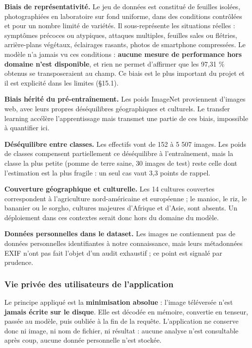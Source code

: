 \documentclass[10pt,a4paper]{article}
\begin{document}
\textbf{Biais de représentativité.} Le jeu de données est constitué de feuilles isolées, photographiées en laboratoire sur fond uniforme, dans des conditions contrôlées et pour un nombre limité de variétés. Il sous-représente les situations réelles : symptômes précoces ou atypiques, attaques multiples, feuilles sales ou flétries, arrière-plans végétaux, éclairages rasants, photos de smartphone compressées. Le modèle n'a jamais vu ces conditions : \textbf{aucune mesure de performance hors domaine n'est disponible}, et rien ne permet d'affirmer que les 97,31 \% obtenus se transposeraient au champ. Ce biais est le plus important du projet et il est explicité dans les limites (\S{}15.1).

\textbf{Biais hérité du pré-entraînement.} Les poids ImageNet proviennent d'images web, avec leurs propres déséquilibres géographiques et culturels. Le transfer learning accélère l'apprentissage mais transmet une partie de ces biais, impossible à quantifier ici.

\textbf{Déséquilibre entre classes.} Les effectifs vont de 152 à 5 507 images. Les poids de classes compensent partiellement ce déséquilibre à l'entraînement, mais la classe la plus petite (pomme de terre saine, 30 images de test) reste celle dont l'estimation est la plus fragile : un seul cas vaut 3,3 points de rappel.

\textbf{Couverture géographique et culturelle.} Les 14 cultures couvertes correspondent à l'agriculture nord-américaine et européenne ; le manioc, le riz, le bananier ou le sorgho, cultures majeures d'Afrique et d'Asie, sont absents. Un déploiement dans ces contextes serait donc hors du domaine du modèle.

\textbf{Données personnelles dans le dataset.} Les images ne contiennent pas de données personnelles identifiantes à notre connaissance, mais leurs métadonnées EXIF n'ont pas fait l'objet d'un audit exhaustif ; ce point est signalé par prudence.

\subsubsection{Vie privée des utilisateurs de l'application}

Le principe appliqué est la \textbf{minimisation absolue} : l'image téléversée n'est \textbf{jamais écrite sur le disque}. Elle est décodée en mémoire, convertie en tenseur, passée au modèle, puis oubliée à la fin de la requête. L'application ne conserve donc ni image, ni nom de fichier, ni résultat : aucune analyse n'est consultable après coup, aucune donnée personnelle n'est stockée.
\end{document}
